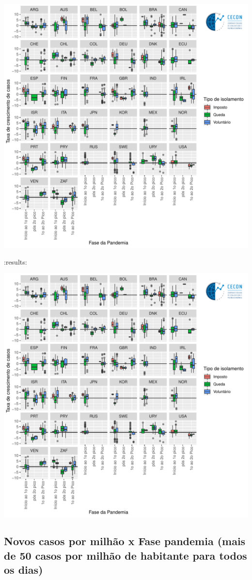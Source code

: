 \documentclass{SelfArx}
\begin{document}
\begin{center}
\includegraphics[width=.9\linewidth]{./figs/COVID/Casos_Policy_10_Todos.pdf}
\end{center}
:results:
\begin{center}
\includegraphics[width=.9\linewidth]{./figs/COVID/Casos_Policy_10_Todos.pdf}
\end{center}
\subsection*{Novos casos por milhão x Fase pandemia (mais de 50 casos por milhão de habitante para todos os dias)}
\label{sec:orga19a7a0}
\end{document}
